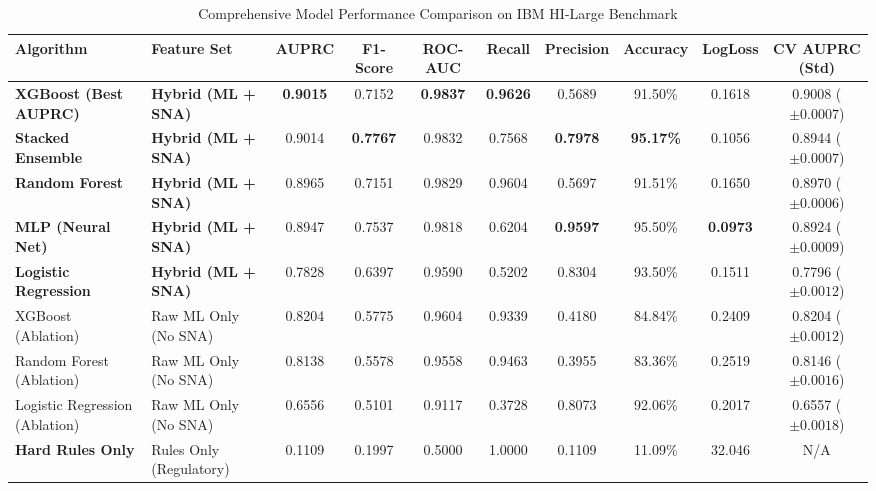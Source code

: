 \begin{table}[hbt!]
\centering
\caption{Comprehensive Model Performance Comparison on IBM HI-Large Benchmark}
\label{tab:ibm_model_comparison}
\begin{adjustbox}{width=\textwidth,center=\textwidth}
\begin{tabular}{|l|l|c|c|c|c|c|c|c|c|}
\hline
\rowcolor{gray!40}
\textbf{Algorithm} & \textbf{Feature Set} & \textbf{AUPRC} & \textbf{F1-Score} & \textbf{ROC-AUC} & \textbf{Recall} & \textbf{Precision} & \textbf{Accuracy} & \textbf{LogLoss} & \textbf{CV AUPRC (Std)} \\
\hline
\textbf{XGBoost (Best AUPRC)} & \textbf{Hybrid (ML + SNA)} & \textbf{0.9015} & 0.7152 & \textbf{0.9837} & \textbf{0.9626} & 0.5689 & 91.50\% & 0.1618 & 0.9008 ($\pm 0.0007$) \\
\hline
\textbf{Stacked Ensemble} & \textbf{Hybrid (ML + SNA)} & 0.9014 & \textbf{0.7767} & 0.9832 & 0.7568 & \textbf{0.7978} & \textbf{95.17\%} & 0.1056 & 0.8944 ($\pm 0.0007$) \\
\hline
\textbf{Random Forest} & \textbf{Hybrid (ML + SNA)} & 0.8965 & 0.7151 & 0.9829 & 0.9604 & 0.5697 & 91.51\% & 0.1650 & 0.8970 ($\pm 0.0006$) \\
\hline
\textbf{MLP (Neural Net)} & \textbf{Hybrid (ML + SNA)} & 0.8947 & 0.7537 & 0.9818 & 0.6204 & \textbf{0.9597} & 95.50\% & \textbf{0.0973} & 0.8924 ($\pm 0.0009$) \\
\hline
\textbf{Logistic Regression} & \textbf{Hybrid (ML + SNA)} & 0.7828 & 0.6397 & 0.9590 & 0.5202 & 0.8304 & 93.50\% & 0.1511 & 0.7796 ($\pm 0.0012$) \\
\hline
\hline
XGBoost (Ablation) & Raw ML Only (No SNA) & 0.8204 & 0.5775 & 0.9604 & 0.9339 & 0.4180 & 84.84\% & 0.2409 & 0.8204 ($\pm 0.0012$) \\
\hline
Random Forest (Ablation) & Raw ML Only (No SNA) & 0.8138 & 0.5578 & 0.9558 & 0.9463 & 0.3955 & 83.36\% & 0.2519 & 0.8146 ($\pm 0.0016$) \\
\hline
Logistic Regression (Ablation) & Raw ML Only (No SNA) & 0.6556 & 0.5101 & 0.9117 & 0.3728 & 0.8073 & 92.06\% & 0.2017 & 0.6557 ($\pm 0.0018$) \\
\hline
\hline
\textbf{Hard Rules Only} & Rules Only (Regulatory) & 0.1109 & 0.1997 & 0.5000 & 1.0000 & 0.1109 & 11.09\% & 32.046 & N/A \\
\hline
\end{tabular}
\end{adjustbox}
\end{table}

